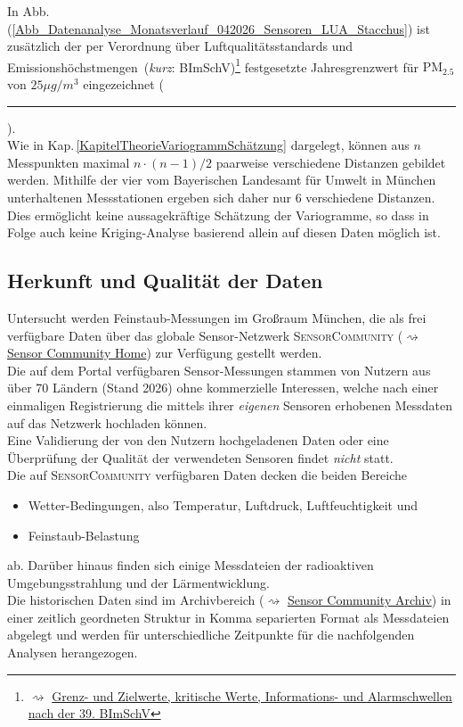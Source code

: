 In Abb.\,(\ref{Abb_Datenanalyse_Monatsverlauf_042026_Sensoren_LUA_Stacchus})
ist zusätzlich der per 
\glqq Verordnung über Luftqualitätsstandards 
und Emissions\-höchst\-mengen\grqq\ 
(\textit{kurz}: BImSchV)\footnote{$\rightsquigarrow$
\href{https://www.lfu.bayern.de/luft/immissionsmessungen/doc/grenzwerte.pdf}
{Grenz- und Zielwerte, kritische Werte, Informations- und Alarmschwellen
nach der 39. BImSchV}}
festgesetzte Jahresgrenzwert für $\mathrm{PM}_{2.5}$ 
von $25\mu g/ m^3$ eingezeichnet 
(\textcolor{red}{\rule[1mm]{3mm}{0.5mm}}).\\

Wie in Kap.\,\ref{KapitelTheorieVariogrammSchätzung} dargelegt, 
können aus $n$ Messpunkten maximal $n\cdot(n-1)/2$ paarweise 
verschiedene Distanzen gebildet werden. 
Mithilfe der vier vom Bayerischen Landesamt für Umwelt in München 
unterhaltenen Messstationen ergeben sich daher nur 6 verschiedene
Distanzen. Dies ermöglicht keine aussagekräftige Schätzung der 
Variogramme, so dass in Folge auch keine Kriging-Analyse basierend 
allein auf diesen Daten möglich ist.  

\subsection{Herkunft und Qualität der Daten}
\label{KapitelDatenanalyseDatenHerkunft}
Untersucht werden Feinstaub-Messungen im Großraum München, die als frei verfügbare 
Daten über das globale Sensor-Netzwerk \textsc{SensorCommunity} 
($\rightsquigarrow$ \href{https://sensor.community/de/}{Sensor Community Home})
zur Verfügung gestellt werden.\\
Die auf dem Portal verfügbaren Sensor-Messungen stammen von 
Nutzern aus über 70 Ländern (Stand 2026) ohne kommerzielle Interessen, 
welche nach einer einmaligen Registrierung die mittels ihrer 
\textit{eigenen} Sensoren erhobenen Messdaten auf das Netzwerk 
hochladen können. \\
Eine Validierung der von den Nutzern hochgeladenen Daten 
oder eine Überprüfung der Qualität der verwendeten 
Sensoren findet \textit{nicht} statt.\\

Die auf \textsc{SensorCommunity} verfügbaren Daten decken die beiden Bereiche
\begin{itemize}[topsep=2pt,parsep=1pt,itemsep=0.5pt]
\item[a) ] Wetter-Bedingungen, also Temperatur, Luftdruck, Luftfeuchtigkeit und
\item[b) ] Feinstaub-Belastung
\end{itemize}
ab. Darüber hinaus finden sich einige Messdateien der radioaktiven 
Umgebungsstrahlung und der Lärmentwicklung. \\
Die historischen Daten sind im Archivbereich 
($\rightsquigarrow$ \href{https://archive.sensor.community/}
{Sensor Community Archiv}) in einer  zeitlich geordneten Struktur in
Komma separierten Format als Messdateien abgelegt 
und werden für unterschiedliche Zeitpunkte für die nachfolgenden Analysen
 herangezogen.
 
